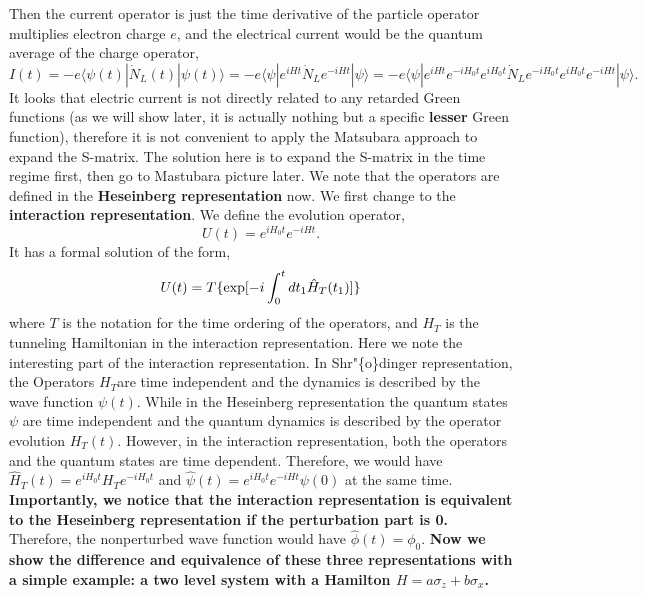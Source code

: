 \documentclass[11pt]{article}
\begin{document}
    Then the current operator is just the time derivative of the particle
operator multiplies electron charge \(e\), and the electrical current
would be the quantum average of the charge operator, \[
I(t)=-e \langle \psi(t)|\dot N_L(t)|\psi(t)\rangle=-e\langle\psi|e^{iHt}\dot
N_Le^{-iHt}|\psi\rangle
=-e\langle\psi|e^{iHt}e^{-iH_0t}e^{iH_0t}\dot
N_Le^{-iH_0t}e^{iH_0t}e^{-iHt}|\psi\rangle.
\] It looks that electric current is not directly related to any
retarded Green functions (as we will show later, it is actually nothing
but a specific \textbf{lesser} Green function), therefore it is not
convenient to apply the Matsubara approach to expand the S-matrix. The
solution here is to expand the S-matrix in the time regime first, then
go to Mastubara picture later. We note that the operators are defined in
the \textbf{Heseinberg representation} now. We first change to the
\textbf{interaction representation}. We define the evolution operator,
\[
U(t)=e^{iH_0t}e^{-iHt}.
\] It has a formal solution of the form, \[
U(t)= T \{{\rm exp}[-i\int_0^t dt_1 \hat H_T(t_1)]\}
\] where \(T\) is the notation for the time ordering of the operators,
and \(H_T\) is the tunneling Hamiltonian in the interaction
representation. Here we note the interesting part of the interaction
representation. In Shr"\{o\}dinger representation, the Operators
\(H_T\)are time independent and the dynamics is described by the wave
function \(\psi(t)\). While in the Heseinberg representation the quantum
states \(\psi\) are time independent and the quantum dynamics is
described by the operator evolution \(H_T(t)\). However, in the
interaction representation, both the operators and the quantum states
are time dependent. Therefore, we would have
\(\hat H_T(t) = e^{iH_0 t} H_T e^{-iH_0 t}\) and
\(\hat \psi(t) = e^{iH_0 t} e^{-iH t} \psi(0)\) at the same time.
\textbf{Importantly, we notice that the interaction representation is
equivalent to the Heseinberg representation if the perturbation part is
0.} Therefore, the nonperturbed wave function would have
\(\hat \phi (t) = \phi_0\). \textbf{Now we show the difference and
equivalence of these three representations with a simple example: a two
level system with a Hamilton \(H= a\sigma_z + b \sigma_x\).}
\end{document}
